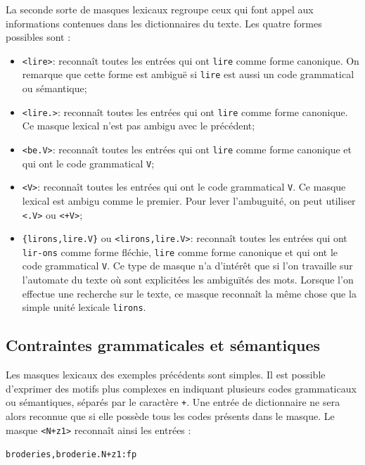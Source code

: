 La seconde sorte de masques lexicaux regroupe ceux qui font appel aux informations contenues
dans les dictionnaires du texte. Les quatre formes possibles sont :


\bigskip
\begin{itemize}
\item \verb+<lire>+: reconnaît toutes les entrées qui ont \verb+lire+ comme forme canonique.
	On remarque que cette forme est ambiguë si \verb+lire+ est aussi un code grammatical ou
	sémantique;
  \item \verb+<lire.>+: reconnaît toutes les entrées qui ont \verb+lire+ comme forme canonique.
  	  Ce masque lexical n'est pas ambigu avec le précédent;
  \item \verb+<be.V>+: reconnaît toutes les entrées qui ont \verb+lire+ comme forme canonique
                       et qui ont le code grammatical  \verb+V+;
  \item \verb+<V>+: reconnaît toutes les entrées qui ont le code grammatical \verb+V+.
  	  Ce masque lexical est ambigu comme le premier. Pour lever l'ambuguité, on peut utiliser
  	  \verb+<.V>+ ou \verb$<+V>$;
\item \verb+{lirons,lire.V}+ ou \verb+<lirons,lire.V>+: reconnaît toutes les entrées qui ont
	\verb+lir-+\newline\verb+ons+ comme forme fléchie, \verb+lire+ comme forme canonique et qui
	ont le code grammatical
  \verb+V+. Ce type de masque n’a d’intérêt que si l’on travaille sur l’automate du texte où sont
  explicitées les ambiguïtés des mots.
   Lorsque l’on effectue une recherche sur
le texte, ce masque reconnaît la même chose que la simple unité lexicale \verb+lirons+.
\end{itemize}

\subsection{Contraintes grammaticales et sémantiques}

Les masques lexicaux des exemples précédents sont simples. Il est possible d’exprimer des
motifs plus complexes en indiquant plusieurs codes grammaticaux ou sémantiques, séparés
par le caractère \verb$+$. Une entrée de dictionnaire ne sera alors reconnue que si elle 
possède tous les codes présents dans le masque.
 Le masque \verb$<N+z1>$ reconnaît ainsi les entrées :

\bigskip
\noindent
\texttt{broderies,broderie.N+z1:fp}


